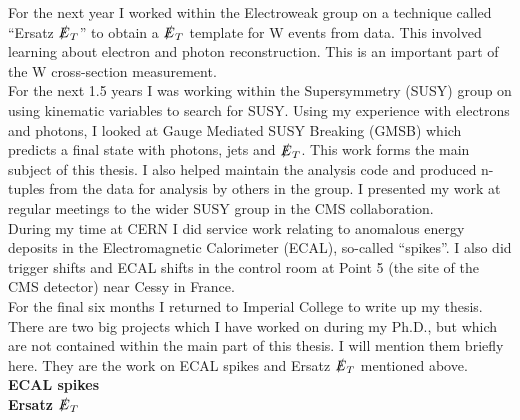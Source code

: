 For the next year I worked within the Electroweak group on a technique called 
``Ersatz $\slashed{E}_{T}$'' to obtain a $\slashed{E}_{T}$ template for W events from data. This 
involved learning about electron and photon reconstruction. This is an important 
part of the W cross-section measurement. \\

For the next 1.5 years I was working within the Supersymmetry (SUSY) group on 
using kinematic variables to search for SUSY. Using my experience with electrons 
and photons, I looked at Gauge Mediated SUSY Breaking (GMSB) which predicts a 
final state with photons, jets and $\slashed{E}_{T}$. This work forms the main subject of 
this thesis. I also helped maintain the analysis code and produced n-tuples from 
the data for analysis by others in the group. I presented my work at regular 
meetings to the wider SUSY group in the CMS collaboration. \\

During my time at CERN I did service work relating to anomalous energy deposits 
in the Electromagnetic Calorimeter (ECAL), so-called ``spikes''. I also did 
trigger shifts and ECAL shifts in the control room at Point 5 (the site of the 
CMS detector) near Cessy in France. \\

For the final six months I returned to Imperial College to write up my thesis.
\\

There are two big projects which I have worked on during my Ph.D., but which are
not contained within the main part of this thesis. I will mention them briefly
here. They are the work on ECAL spikes and Ersatz $\slashed{E}_{T}$ mentioned above. \\

{\bf ECAL spikes} \\

{\bf Ersatz $\slashed{E}_{T}$} \\
